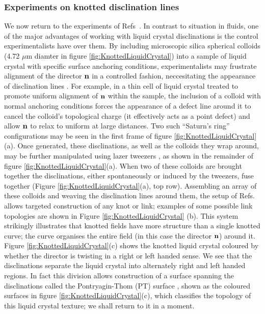 \subsubsection{Experiments on knotted disclination lines}

We now return to the experiments of Refs~\citep{Tkalec2011,Tasinkevych2014,Copar2015}. In contrast to situation in fluids, one of the major advantages of working with liquid crystal disclinations is the control experimentalists have over them. By including microscopic silica spherical colloids (4.72 $\mu$m diamter in figure \ref{fig:KnottedLiquidCrystal}) into a sample of liquid crystal with specific surface anchoring conditions, experimentalists may frustrate alignment of the director $\bf n$ in a controlled fashion, neccesitating the appearance of disclination lines \cite{}. For example, in a thin cell of liquid crystal treated to promote uniform alignment of $\bf n$ within the sample, the inclusion of a colloid with normal anchoring conditions forces the appearance of a defect line around it to cancel the colloid's topological charge (it effectively acts as a point defect) and allow $\bf n$ to relax to uniform at large distances. Two such ``Saturn's ring'' configurations may be seen in the first frame of figure \ref{fig:KnottedLiquidCrystal}(a). Once generated, these disclinations, as well as the colloids they wrap around, may be further manipulated using lazer tweezers \citep{Tkalec2011}, as shown in the remainder of figure \ref{fig:KnottedLiquidCrystal}(a). When two of these colloids are brought together the disclinations, either spontaneously or induced by the tweezers, fuse together (Figure \ref{fig:KnottedLiquidCrystal}(a), top row). Assembling an array of these colloids and weaving the disclination lines around them, the setup of Refs.~\citep{Tkalec2011,Tasinkevych2014,Copar2015} allows targeted construction of any knot or link; examples of some possible link topologies are shown in Figure \ref{fig:KnottedLiquidCrystal} (b). This system strikingly illustrates that knotted fields have more structure than a single knotted curve; the curve organises the entire field (in this case the director $\bf n$) around it. Figure \ref{fig:KnottedLiquidCrystal}(c) shows the knotted liquid crystal coloured by whether the director is twisting in a right or left handed sense. We see that the disclinations separate the liquid crystal into alternately right and left handed regions. In fact this division allows construction of a surface spanning the disclinations called the Pontryagin-Thom (PT) surface \cite{Chen}, shown as the coloured surfaces in figure \ref{fig:KnottedLiquidCrystal}(c), which classifies the topology of this liquid crystal texture; we shall return to it in a moment.

